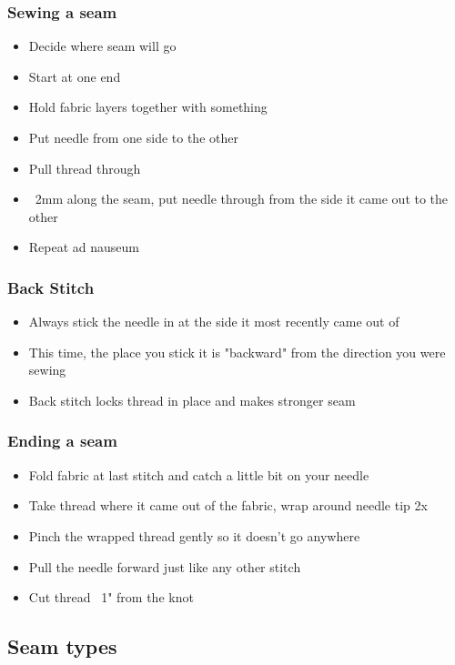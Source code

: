 \documentclass{beamer}
\begin{document}
\begin{frame}[fragile]
\frametitle{Sewing a seam}
\begin{itemize}
\item Decide where seam will go
\item Start at one end
\item Hold fabric layers together with something
\item Put needle from one side to the other
\item Pull thread through
\item ~2mm along the seam, put needle through from the side it came out to the other
\item Repeat ad nauseum
\end{itemize}
\end{frame}

\begin{frame}[fragile]
\frametitle{Back Stitch}
\begin{itemize}
\item Always stick the needle in at the side it most recently came out of
\item This time, the place you stick it is "backward" from the direction you were sewing
\item Back stitch locks thread in place and makes stronger seam
\end{itemize}
\end{frame}

\begin{frame}[fragile]
\frametitle{Ending a seam}
\begin{itemize}
\item Fold fabric at last stitch and catch a little bit on your needle
\item Take thread where it came out of the fabric, wrap around needle tip 2x
\item Pinch the wrapped thread gently so it doesn't go anywhere
\item Pull the needle forward just like any other stitch
\item Cut thread ~1" from the knot
\end{itemize}
\end{frame}

\subsection{Seam types}

\begin{frame}[fragile]
\tableofcontents[currentsubsection]
\end{frame}
\end{document}

